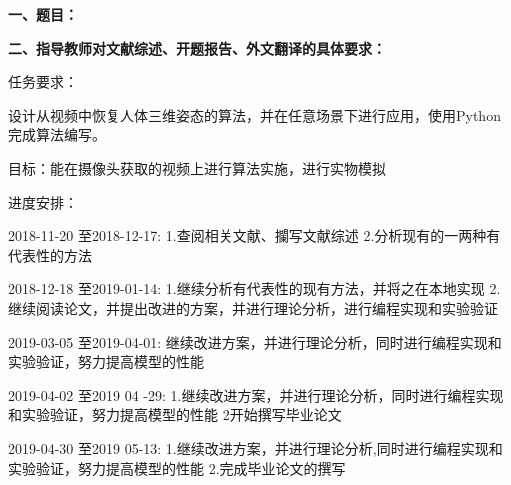 {
    \setlength{\parindent}{0em}
    \par {\bfseries 一、题目：\Title}
    \\
    \par {\bfseries 二、指导教师对文献综述、开题报告、外文翻译的具体要求：}

    任务要求：

设计从视频中恢复人体三维姿态的算法，并在任意场景下进行应用，使用Python完成算法编写。

目标：能在摄像头获取的视频上进行算法实施，进行实物模拟
 
进度安排：

2018-11-20 至2018-12-17: 1.查阅相关文献、攔写文献综述  2.分析现有的一两种有代表性的方法
      
2018-12-18 至2019-01-14: 1.继续分析有代表性的现有方法，并将之在本地实现  2.继续阅读论文，并提出改进的方案，并进行理论分析，进行编程实现和实验验证

2019-03-05 至2019-04-01: 继续改进方案，并进行理论分析，同时进行编程实现和实验验证，努力提高模型的性能

2019-04-02 至2019 04 -29: 1.继续改进方案，并进行理论分析，同时进行编程实现和实验验证，努力提高模型的性能  2开始撰写毕业论文

2019-04-30 至2019 05-13: 1.继续改进方案，并进行理论分析,同时进行编程实现和实验验证，努力提高模型的性能  2.完成毕业论文的撰写

}

\mbox{} \vfill

